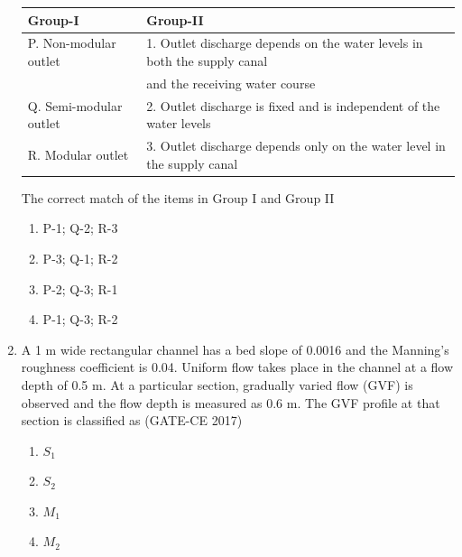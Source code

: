 \documentclass[journal,12pt,onecolumn]{article}
\theoremstyle{remark}
\begin{document}
\begin{enumerate}
    \begin{table}[H]
    \centering
    \begin{tabular}{|l|l|}
    \hline
    \textbf{Group-I} & \textbf{Group-II} \\
    \hline
    P. Non-modular outlet & 1. Outlet discharge depends on the water levels in both the supply canal\\ & and the receiving water course\\
    Q. Semi-modular outlet & 2. Outlet discharge is fixed and is independent of the water levels \\
    R. Modular outlet & 3. Outlet discharge depends only on the water level in the supply canal \\
    \hline
    \end{tabular}
    \end{table}
    The correct match of the items in Group I and Group II
    
    \begin{enumerate}
        \item P-1; Q-2; R-3
        \item P-3; Q-1; R-2
        \item P-2; Q-3; R-1
        \item P-1; Q-3; R-2
    \end{enumerate}

    \item A 1 m wide rectangular channel has a bed slope of 0.0016 and the Manning's roughness coefficient is 0.04. Uniform flow takes place in the channel at a flow depth of 0.5 m. At a particular section, gradually varied flow (GVF) is observed and the flow depth is measured as 0.6 m. The GVF profile at that section is classified as \hfill (GATE-CE 2017)
    \begin{multicols}{4}
    \begin{enumerate}
        \item $S_1$
        \item $S_2$
        \item $M_1$
        \item $M_2$
    \end{enumerate}
    \end{multicols}


\end{enumerate}
\end{document}
